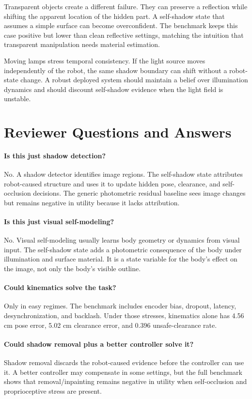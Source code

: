 \documentclass{article}
\begin{document}
Transparent objects create a different failure. They can preserve a reflection while shifting the apparent location of the hidden part. A self-shadow state that assumes a simple surface can become overconfident. The benchmark keeps this case positive but lower than clean reflective settings, matching the intuition that transparent manipulation needs material estimation.

Moving lamps stress temporal consistency. If the light source moves independently of the robot, the same shadow boundary can shift without a robot-state change. A robust deployed system should maintain a belief over illumination dynamics and should discount self-shadow evidence when the light field is unstable.

\section{Reviewer Questions and Answers}

\paragraph{Is this just shadow detection?}
No. A shadow detector identifies image regions. The self-shadow state attributes robot-caused structure and uses it to update hidden pose, clearance, and self-occlusion decisions. The generic photometric residual baseline sees image changes but remains negative in utility because it lacks attribution.

\paragraph{Is this just visual self-modeling?}
No. Visual self-modeling usually learns body geometry or dynamics from visual input. The self-shadow state adds a photometric consequence of the body under illumination and surface material. It is a state variable for the body's effect on the image, not only the body's visible outline.

\paragraph{Could kinematics solve the task?}
Only in easy regimes. The benchmark includes encoder bias, dropout, latency, desynchronization, and backlash. Under those stresses, kinematics alone has 4.56 cm pose error, 5.02 cm clearance error, and 0.396 unsafe-clearance rate.

\paragraph{Could shadow removal plus a better controller solve it?}
Shadow removal discards the robot-caused evidence before the controller can use it. A better controller may compensate in some settings, but the full benchmark shows that removal/inpainting remains negative in utility when self-occlusion and proprioceptive stress are present.
\end{document}
